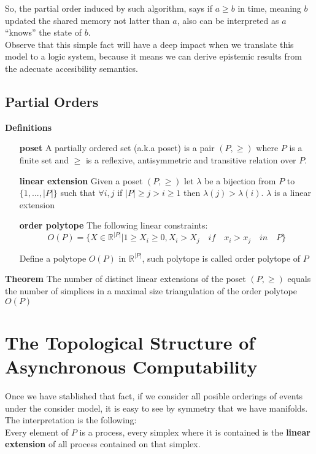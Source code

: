 \documentclass{tufte-book} %
\begin{document}
So, the partial order induced by such algorithm, says if $a \ge b$ in time, meaning $b$ updated the shared memory not latter than $a$, also can be interpreted as $a$ ``knows'' the state of $b$. \\
Observe that this simple fact will have a deep impact when we translate this model to a logic system, because it means we can derive epistemic results from the adecuate accesibility semantics.\\

\subsection{Partial Orders}

{\bf Definitions}
\begin{itemize}
\item[{\bf poset}] A partially ordered set (a.k.a poset) is a pair $(P,\ge)$ where $P$ is a finite set and $\ge$ is a reflexive, antisymmetric and transitive relation over $P$.
\item[{\bf linear extension}] Given a poset $(P,\ge)$ let $\lambda$ be a bijection from $P$ to $\{1,...,|P|\}$ such that $\forall i,j$ if $|P| \ge j > i \ge 1$ then $\lambda(j) > \lambda(i)$. $\lambda$ is a linear extension
\item[{\bf order polytope}] The following linear constraints:\\
$$
O(P)=\{X\in \mathbb{R}^{|P|} | 1 \ge X_i \ge 0, X_i > X_j \quad if \quad x_i > x_j \quad in \quad P  \}
$$

Define a polytope $O(P)$ in $ \mathbb{R}^{|P|} $, such polytope is called order polytope of  $P$ \cite{Stanley1986}
\end{itemize}

{\bf Theorem} The number of distinct linear extensions of the poset $(P,\ge)$ equals the number of simplices in a maximal size triangulation of the order polytope $O(P)$ \\

\section{The Topological Structure of Asynchronous Computability}

Once we have stablished that fact, if we consider all posible orderings of events under the consider model, it is easy to see by symmetry that we have manifolds.\\

The interpretation is the following:\\
Every element of $P$ is a process, every simplex where it is contained is the {\bf linear extension} of all process contained on that simplex.
\end{document}
